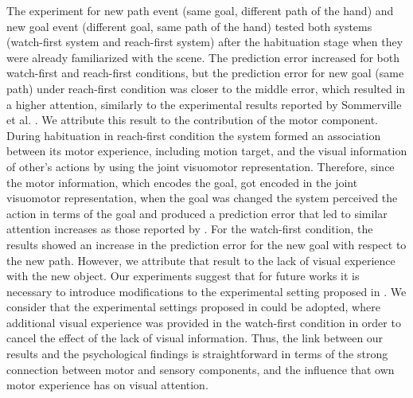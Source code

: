 \documentclass[conference]{IEEEtran}
\begin{document}
The experiment for new path event (same goal, different path of the hand) and new goal event (different goal, same path of the hand) tested both systems (watch-first system and reach-first system) after the habituation stage when they were already familiarized with the scene. The prediction error increased for both watch-first and reach-first conditions, but the prediction error for new goal (same path) under reach-first condition was closer to the middle error, which resulted in a higher attention, similarly to the experimental results reported by Sommerville et al. \cite{sommerville2005action}. We attribute this result to the contribution of the motor component. During habituation in reach-first condition the system formed an association between its motor experience, including motion target, and the visual information of other's actions by using the joint visuomotor representation. Therefore, since the motor information, which encodes the goal, got encoded in the joint visuomotor representation, when the goal was changed the system perceived the action in terms of the goal and produced a prediction error that led to similar attention increases as those reported by \cite{sommerville2005action}. For the watch-first condition, the results showed an increase in the prediction error for the new goal with respect to the new path. However, we attribute that result to the lack of visual experience with the new object. Our experiments suggest that for future works it is necessary to introduce modifications to the experimental setting proposed in \cite{sommerville2005action}. We consider that the experimental settings proposed in \cite{gerson2014learning} could be adopted, where additional visual experience was provided in the watch-first condition in order to cancel the effect of the lack of visual information. Thus, the link between our results and the psychological findings is straightforward in terms of the strong connection between motor and sensory components, and the influence that own motor experience has on visual attention.
\end{document}
